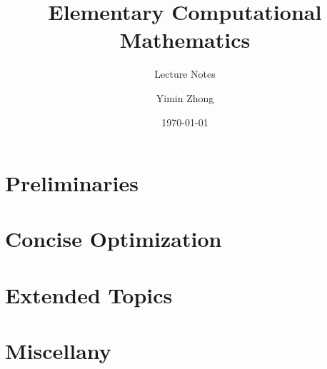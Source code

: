 \documentclass[12pt,letterpaper,final]{book}
\title{Elementary Computational Mathematics}
\subtitle{Lecture Notes}
\author{Yimin Zhong}
\date{\today}
\begin{document}
\maketitle

\tableofcontents
\part{Preliminaries}









\part{Concise Optimization}
\part{Extended Topics}

\part{Miscellany}
\end{document}
